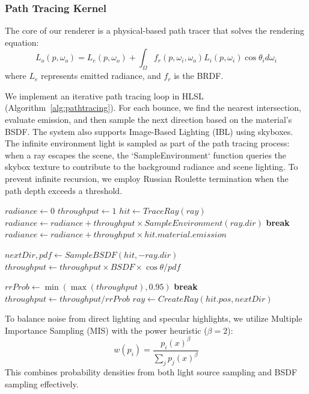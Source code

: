 \documentclass[sigconf]{acmart}
\begin{document}
\subsubsection{Path Tracing Kernel}
The core of our renderer is a physical-based path tracer that solves the rendering equation:
\begin{equation}
L_o(p, \omega_o) = L_e(p, \omega_o) + \int_{\Omega} f_r(p, \omega_i, \omega_o) L_i(p, \omega_i) \cos\theta_i d\omega_i
\end{equation}
where $L_e$ represents emitted radiance, and $f_r$ is the BRDF.

We implement an iterative path tracing loop in HLSL (Algorithm~\ref{alg:pathtracing}). For each bounce, we find the nearest intersection, evaluate emission, and then sample the next direction based on the material's BSDF. The system also supports Image-Based Lighting (IBL) using skyboxes. The infinite environment light is sampled as part of the path tracing process: when a ray escapes the scene, the `SampleEnvironment` function queries the skybox texture to contribute to the background radiance and scene lighting. To prevent infinite recursion, we employ Russian Roulette termination when the path depth exceeds a threshold.

\begin{algorithm}[H]
\caption{Path Tracing with Russian Roulette}
\begin{algorithmic}[1]
\State $radiance \gets 0$
\State $throughput \gets 1$
    \State $hit \gets TraceRay(ray)$
        \State $radiance \gets radiance + throughput \times SampleEnvironment(ray.dir)$
        \State \textbf{break}
    \EndIf
    \State $radiance \gets radiance + throughput \times hit.material.emission$

    \State $nextDir, pdf \gets SampleBSDF(hit, -ray.dir)$
    \State $throughput \gets throughput \times BSDF \times \cos\theta / pdf$

        \State $rrProb \gets \min(\max(throughput), 0.95)$
            \State \textbf{break}
        \EndIf
        \State $throughput \gets throughput / rrProb$
    \EndIf
    \State $ray \gets CreateRay(hit.pos, nextDir)$
\EndFor
\end{algorithmic}
\label{alg:pathtracing}
\end{algorithm}

To balance noise from direct lighting and specular highlights, we utilize Multiple Importance Sampling (MIS) with the power heuristic ($\beta=2$):
\begin{equation}
w(p_i) = \frac{p_i(x)^\beta}{\sum_j p_j(x)^\beta}
\end{equation}
This combines probability densities from both light source sampling and BSDF sampling effectively.
\end{document}

